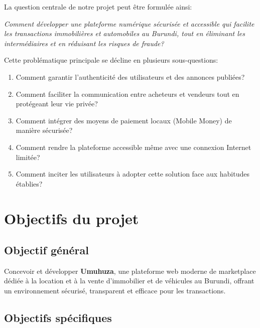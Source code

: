 \documentclass[12pt,a4paper]{report}
\begin{document}
La question centrale de notre projet peut être formulée ainsi:

\begin{center}
    \textit{Comment développer une plateforme numérique sécurisée et accessible qui facilite les transactions immobilières et automobiles au Burundi, tout en éliminant les intermédiaires et en réduisant les risques de fraude?}
\end{center}

Cette problématique principale se décline en plusieurs sous-questions:

\begin{enumerate}
    \item Comment garantir l'authenticité des utilisateurs et des annonces publiées?
    \item Comment faciliter la communication entre acheteurs et vendeurs tout en protégeant leur vie privée?
    \item Comment intégrer des moyens de paiement locaux (Mobile Money) de manière sécurisée?
    \item Comment rendre la plateforme accessible même avec une connexion Internet limitée?
    \item Comment inciter les utilisateurs à adopter cette solution face aux habitudes établies?
\end{enumerate}

\section{Objectifs du projet}

\subsection{Objectif général}

Concevoir et développer \textbf{Umuhuza}, une plateforme web moderne de marketplace dédiée à la location et à la vente d'immobilier et de véhicules au Burundi, offrant un environnement sécurisé, transparent et efficace pour les transactions.

\subsection{Objectifs spécifiques}
\end{document}
